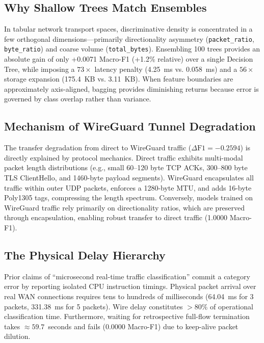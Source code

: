 \documentclass[conference]{IEEEtran}
\begin{document}
\subsection{Why Shallow Trees Match Ensembles}
In tabular network transport spaces, discriminative density is concentrated in a few orthogonal dimensions---primarily directionality asymmetry (\texttt{packet\_ratio}, \texttt{byte\_ratio}) and coarse volume (\texttt{total\_bytes}). Ensembling 100 trees provides an absolute gain of only +0.0071 Macro-F1 (+1.2\% relative) over a single Decision Tree, while imposing a $73\times$ latency penalty (4.25~ms vs. 0.058~ms) and a $56\times$ storage expansion (175.4~KB vs. 3.11~KB). When feature boundaries are approximately axis-aligned, bagging provides diminishing returns because error is governed by class overlap rather than variance.

\subsection{Mechanism of WireGuard Tunnel Degradation}
The transfer degradation from direct to WireGuard traffic ($\Delta\text{F1} = -0.2594$) is directly explained by protocol mechanics. Direct traffic exhibits multi-modal packet length distributions (e.g., small 60--120 byte TCP ACKs, 300--800 byte TLS ClientHello, and 1460-byte payload segments). WireGuard encapsulates all traffic within outer UDP packets, enforces a 1280-byte MTU, and adds 16-byte Poly1305 tags, compressing the length spectrum. Conversely, models trained on WireGuard traffic rely primarily on directionality ratios, which are preserved through encapsulation, enabling robust transfer to direct traffic (1.0000 Macro-F1).

\subsection{The Physical Delay Hierarchy}
Prior claims of ``microsecond real-time traffic classification'' commit a category error by reporting isolated CPU instruction timings. Physical packet arrival over real WAN connections requires tens to hundreds of milliseconds (64.04~ms for 3 packets, 331.38~ms for 5 packets). Wire delay constitutes $>80\%$ of operational classification time. Furthermore, waiting for retrospective full-flow termination takes $\approx 59.7$~seconds and fails (0.0000 Macro-F1) due to keep-alive packet dilution.
\end{document}
